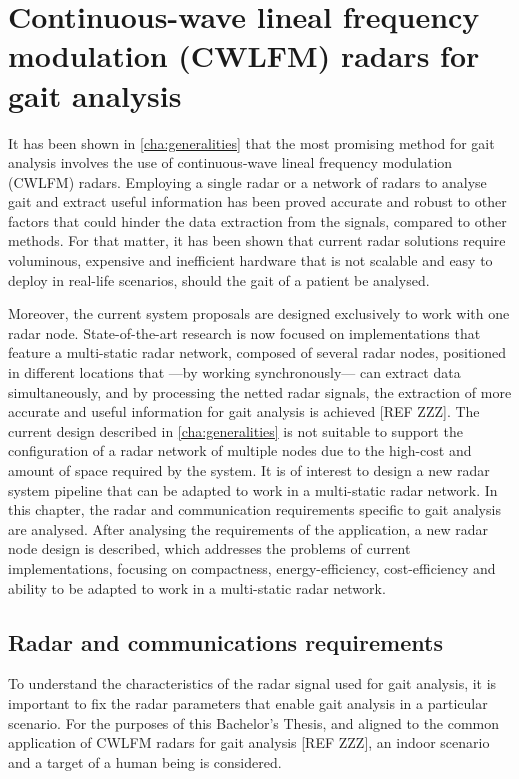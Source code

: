 \chapter{Continuous-wave lineal frequency modulation (CWLFM) radars for gait analysis}

It has been shown in \cref{cha:generalities} that the most promising method for gait analysis involves the use of continuous-wave lineal frequency modulation (CWLFM) radars. Employing a single radar or a network of radars to analyse gait and extract useful information has been proved accurate and robust to other factors that could hinder the data extraction from the signals, compared to other methods. For that matter, it has been shown that current radar solutions require voluminous, expensive and inefficient hardware that is not scalable and easy to deploy in real-life scenarios, should the gait of a patient be analysed.

Moreover, the current system proposals are designed exclusively to work with one radar node. State-of-the-art research is now focused on implementations that feature a multi-static radar network, composed of several radar nodes, positioned in different locations that ---by working synchronously--- can extract data simultaneously, and by processing the netted radar signals, the extraction of more accurate and useful information for gait analysis is achieved [REF ZZZ]. The current design described in \cref{cha:generalities} is not suitable to support the configuration of a radar network of multiple nodes due to the high-cost and amount of space required by the system. It is of interest to design a new radar system pipeline that can be adapted to work in a multi-static radar network. In this chapter, the radar and communication requirements specific to gait analysis are analysed. After analysing the requirements of the application, a new radar node design is described, which addresses the problems of current implementations, focusing on compactness, energy-efficiency, cost-efficiency and ability to be adapted to work in a multi-static radar network.

\section{Radar and communications requirements}

To understand the characteristics of the radar signal used for gait analysis, it is important to fix the radar parameters that enable gait analysis in a particular scenario. For the purposes of this Bachelor's Thesis, and aligned to the common application of CWLFM radars for gait analysis [REF ZZZ], an indoor scenario and a target of a human being is considered.

